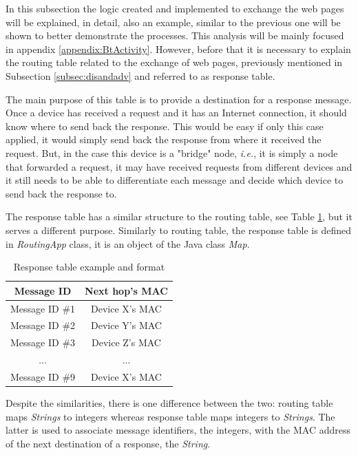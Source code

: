 In this subsection the logic created and implemented to exchange the web pages will be explained, in detail, also an example, similar to the previous one will be shown to better demonstrate the processes. This analysis will be mainly focused in appendix \ref{appendix:BtActivity}. However, before that it is necessary to explain the routing table related to the exchange of web pages, previously mentioned in Subsection \ref{subsec:disandadv} and referred to as response table.

The main purpose of this table is to provide a destination for a response message. Once a device has received a request and it has an Internet connection, it should know where to send back the response. This would be easy if only this case applied, it would simply send back the response from where it received the request. But, in the case this device is a "bridge" node, \textit{i.e.}, it is simply a node that forwarded a request, it may have received requests from different devices and it still needs to be able to differentiate each message and decide which device to send back the response to.

The response table has a similar structure to the routing table, see Table \ref{tab:rspTables}, but it serves a different purpose. Similarly to routing table, the response table is defined in \textit{RoutingApp} class, it is an object of the Java class \textit{Map}.

\begin{table}[ht]
\centering
\bgroup
\def\arraystretch{2.5}
\begin{tabular}{|c|c|}
\hline
\textbf{Message ID} & \textbf{Next hop's MAC} \\ \hline
Message ID \#1 & Device X's MAC \\ \hline
Message ID \#2 & Device Y's MAC \\ \hline
Message ID \#3 & Device Z's MAC \\ \hline
... & ... \\ \hline
Message ID \#9 & Device X's MAC \\ \hline
\end{tabular}
\egroup
\caption{Response table example and format}
\label{tab:rspTables}
\end{table}

Despite the similarities, there is one difference between the two: routing table maps \textit{Strings} to integers whereas response table maps integers to \textit{Strings}. The latter is used to associate message identifiers, the integers, with the \gls{MAC} address of the next destination of a response, the \textit{String}.

